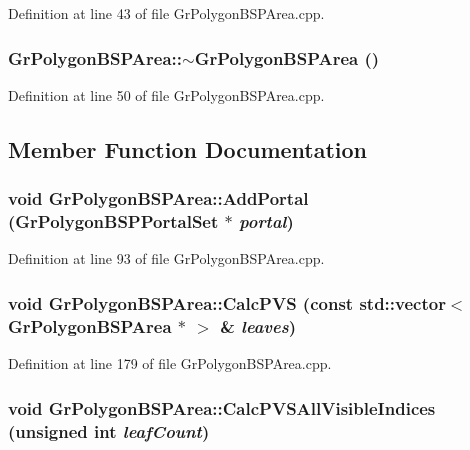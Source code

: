 Definition at line 43 of file GrPolygonBSPArea.cpp.\hypertarget{class_gr_polygon_b_s_p_area_5892b7c346ad8b00b9c384211e9ed12d}{
\subsubsection[{$\sim$GrPolygonBSPArea}]{\setlength{\rightskip}{0pt plus 5cm}GrPolygonBSPArea::$\sim$GrPolygonBSPArea ()}}
\label{class_gr_polygon_b_s_p_area_5892b7c346ad8b00b9c384211e9ed12d}




Definition at line 50 of file GrPolygonBSPArea.cpp.

\subsection{Member Function Documentation}
\hypertarget{class_gr_polygon_b_s_p_area_e32bb3ed77dc93651dbbaaf8ae55b5c8}{
\subsubsection[{AddPortal}]{\setlength{\rightskip}{0pt plus 5cm}void GrPolygonBSPArea::AddPortal ({\bf GrPolygonBSPPortalSet} $\ast$ {\em portal})}}
\label{class_gr_polygon_b_s_p_area_e32bb3ed77dc93651dbbaaf8ae55b5c8}




Definition at line 93 of file GrPolygonBSPArea.cpp.\hypertarget{class_gr_polygon_b_s_p_area_93c40f74ada66587db01a2c044421d02}{
\subsubsection[{CalcPVS}]{\setlength{\rightskip}{0pt plus 5cm}void GrPolygonBSPArea::CalcPVS (const std::vector$<$ {\bf GrPolygonBSPArea} $\ast$ $>$ \& {\em leaves})}}
\label{class_gr_polygon_b_s_p_area_93c40f74ada66587db01a2c044421d02}




Definition at line 179 of file GrPolygonBSPArea.cpp.\hypertarget{class_gr_polygon_b_s_p_area_e35cc92d44e0aed14c6b6d3dcc40ea40}{
\subsubsection[{CalcPVSAllVisibleIndices}]{\setlength{\rightskip}{0pt plus 5cm}void GrPolygonBSPArea::CalcPVSAllVisibleIndices (unsigned int {\em leafCount})}}
\label{class_gr_polygon_b_s_p_area_e35cc92d44e0aed14c6b6d3dcc40ea40}




